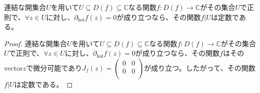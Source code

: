 \documentclass[dvipdfmx]{jsarticle}
\begin{document}
\begin{thm}\label{4.2.8.5}
連結な開集合$U$を用いて$U \subseteq D(f) \subseteq \mathbb{C}$なる関数$f:D(f) \rightarrow \mathbb{C}$がその集合$U$で正則で、$\forall z \in U$に対し、$\partial_{\mathrm{hol}}f(z) = 0$が成り立つなら、その関数$f|U$は定数である。
\end{thm}
\begin{proof}
連結な開集合$U$を用いて$U \subseteq D(f) \subseteq \mathbb{C}$なる関数$f:D(f) \rightarrow \mathbb{C}$がその集合$U$で正則で、$\forall z \in U$に対し、$\partial_{\mathrm{hol}}f(z) = 0$が成り立つなら、その関数$f$はそのvector$z$で微分可能であり$J_{f}(z) = \begin{pmatrix}
0 & 0 \\
0 & 0 \\
\end{pmatrix}$が成り立つ。したがって、その関数$f|U$は定数である。
\end{proof}
\end{document}
